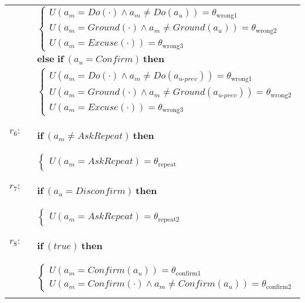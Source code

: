 \begin{small}
\begin{longtable}{p{1cm}p{14cm}}
 & \;\;\;\;\; $ \begin{cases}U(\mathit{a_m}\!=\!\mathit{Do(\cdot)} \land \mathit{a_m}\!\neq\!\mathit{Do({a_u})})\!=\!\theta_{\mathrm{wrong1}} \\
U(\mathit{a_m}\!=\!\mathit{Ground(\cdot)} \land \mathit{a_m}\!\neq\!\mathit{Ground({a_u})})\!=\!\theta_{\mathrm{wrong2}} \\
U(\mathit{a_m}\!=\!\mathit{Excuse(\cdot)})\!=\!\theta_{\mathrm{wrong3}} \end{cases}$\\ & $ \textbf{else if} \ (\mathit{a_u}\!=\!\mathit{Confirm}) \ \textbf{then}$ \\
& \;\;\;\;\; $ \begin{cases}U(\mathit{a_m}\!=\!\mathit{Do(\cdot)} \land \mathit{a_m}\!\neq\!\mathit{Do({a_{u\mbox{-}prev}})})\!=\!\theta_{\mathrm{wrong1}} \\
U(\mathit{a_m}\!=\!\mathit{Ground(\cdot)} \land \mathit{a_m}\!\neq\!\mathit{Ground({a_{u\mbox{-}prev}})})\!=\!\theta_{\mathrm{wrong2}} \\
U(\mathit{a_m}\!=\!\mathit{Excuse(\cdot)})\!=\!\theta_{\mathrm{wrong3}} \end{cases}$ \\ \\[-2mm]
$r_{6}$: \ \ & $ \textbf{if} \ (\mathit{a_m}\!\neq\!\mathit{AskRepeat}) \ \textbf{then} $ \\
 & \;\;\;\;\; $ \begin{cases}U(\mathit{a_m}\!=\!\mathit{AskRepeat})\!=\!\theta_{\mathrm{repeat}} \end{cases}$ \\ \\[-2mm]
$r_{7}$: \ \ & $ \textbf{if} \ (\mathit{a_u}\!=\!\mathit{Disconfirm}) \ \textbf{then} $ \\
 & \;\;\;\;\; $ \begin{cases}U(\mathit{a_m}\!=\!\mathit{AskRepeat})\!=\!\theta_{\mathrm{repeat2}} \end{cases}$ \\ \\[-2mm]
$r_{8}$: \ \ & $ \textbf{if} \ (\mathit{true}) \ \textbf{then}$ \\ & \;\;\;\;\; $\begin{cases}U(\mathit{a_m}\!=\!\mathit{Confirm({a_u})})\!=\!\theta_{\mathrm{confirm1}} \\
U(\mathit{a_m}\!=\!\mathit{Confirm(\cdot)} \land \mathit{a_m}\!\neq\!\mathit{Confirm({a_u})})\!=\!\theta_{\mathrm{confirm2}} \end{cases}$ \\ \\[-2mm]

\end{longtable}
\end{small}
